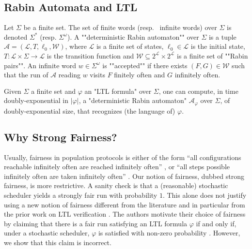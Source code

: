 \documentclass[10pt,a4paper]{article}
\newcommand{\size}[1]{|#1|}
\newcommand*{\buchiaut}{\mathcal{A}}
\newcommand*{\ltlaut}[1]{\buchiaut_{#1}}
\newcommand{\bstates}{\mathcal{L}}
\newcommand{\btransitions}{T}
\newcommand*{\abuchistate}{\ell}
\newcommand*{\bstate}{\abuchistate}
\newcommand*{\binitstate}{\bstate_0}
\newcommand*{\bwinning}{\mathcal{W}}
\begin{document}
\subsection{Rabin Automata and LTL}
Let \(\Sigma\) be a finite set.
The set of finite words (resp.
\ infinite words) over \(\Sigma\) is denoted \(\Sigma^*\) (resp. \(\Sigma^\omega\)).
A ""deterministic Rabin automaton"" over \(\Sigma\) is a tuple \(\buchiaut = (\bstates, \btransitions, \binitstate, \bwinning)\), where \(\bstates\) is a finite set of states, \(\binitstate \in \bstates\) is the initial state, \(\btransitions : \bstates \times \Sigma \rightarrow \bstates\) is the transition function and \(\bwinning \subseteq 2^\bstates \times 2^\bstates\) is a finite set of ""Rabin pairs"".
%
%
An infinite word \(w \in \Sigma^\omega\) is ""accepted"" if there exists \((F, G)\in \bwinning\) such that the run of \(\buchiaut\) reading \(w\) visits \(F\) finitely often and \(G\) infinitely often.
%
%

%

\begin{theorem}
	\label{ltl-rabin}
	Given \(\Sigma\) a finite set and \(\varphi\) an "LTL formula" over \(\Sigma\), one can compute, in time doubly-exponential in \(\size{\varphi}\), a "deterministic Rabin automaton" \(\ltlaut{\varphi}\) over \(\Sigma\), of doubly-exponential size, that recognizes (the language of) \(\varphi\).
\end{theorem}

\subsection{Why Strong Fairness?}
\label{why-strong-fairness}

Usually, fairness in population protocols is either of the form ``all configurations reachable infinitely often are reached infinitely often'' \cite{Comp-Power-Pop-Prot,EGLM17journal}, or ``all steps possible infinitely often are taken infinitely often'' \cite{EGLM16}.
%
Our notion of fairness, dubbed strong fairness, is more restrictive.
A sanity check is that a (reasonable) stochastic scheduler yields a strongly fair run with probability \(1\).
This alone does not justify using a new notion of fairness different from the literature and in particular from the prior work on LTL verification \cite{EGLM16}.
The authors motivate their choice of fairness by claiming that there is a fair run satisfying an LTL formula \(\varphi\) if and only if, under a stochastic scheduler, \(\varphi\) is satisfied with non-zero probability \cite[Proposition~7]{EGLM16}.
However, we show that this claim is incorrect.
\end{document}
